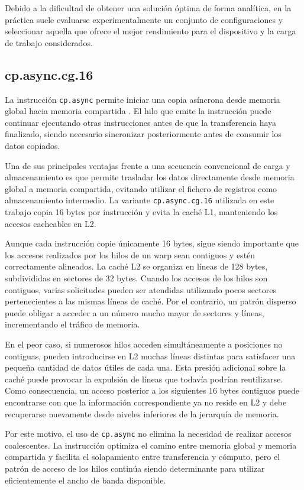 Debido a la dificultad de obtener una solución óptima de forma analítica, en la práctica suele evaluarse experimentalmente un conjunto de configuraciones y seleccionar aquella que ofrece el mejor rendimiento para el dispositivo y la carga de trabajo considerados.

\subsection{cp.async.cg.16}
La instrucción \texttt{cp.async} permite iniciar una copia asíncrona desde memoria global hacia memoria compartida \cite{nvidiaPTX}. El hilo que emite la instrucción puede continuar ejecutando otras instrucciones antes de que la transferencia haya finalizado, siendo necesario sincronizar posteriormente antes de consumir los datos copiados.

Una de sus principales ventajas frente a una secuencia convencional de carga y almacenamiento es que permite trasladar los datos directamente desde memoria global a memoria compartida, evitando utilizar el fichero de registros como almacenamiento intermedio. La variante \texttt{cp.async.cg.16} utilizada en este trabajo copia 16 bytes por instrucción y evita la caché L1, manteniendo los accesos cacheables en L2.

Aunque cada instrucción copie únicamente 16 bytes, sigue siendo importante que los accesos realizados por los hilos de un warp sean contiguos y estén correctamente alineados. La caché L2 se organiza en líneas de 128 bytes, subdivididas en sectores de 32 bytes. Cuando los accesos de los hilos son contiguos, varias solicitudes pueden ser atendidas utilizando pocos sectores pertenecientes a las mismas líneas de caché. Por el contrario, un patrón disperso puede obligar a acceder a un número mucho mayor de sectores y líneas, incrementando el tráfico de memoria.

En el peor caso, si numerosos hilos acceden simultáneamente a posiciones no contiguas, pueden introducirse en L2 muchas líneas distintas para satisfacer una pequeña cantidad de datos útiles de cada una. Esta presión adicional sobre la caché puede provocar la expulsión de líneas que todavía podrían reutilizarse. Como consecuencia, un acceso posterior a los siguientes 16 bytes contiguos puede encontrarse con que la información correspondiente ya no reside en L2 y debe recuperarse nuevamente desde niveles inferiores de la jerarquía de memoria.

Por este motivo, el uso de \texttt{cp.async} no elimina la necesidad de realizar accesos coalescentes. La instrucción optimiza el camino entre memoria global y memoria compartida y facilita el solapamiento entre transferencia y cómputo, pero el patrón de acceso de los hilos continúa siendo determinante para utilizar eficientemente el ancho de banda disponible.

